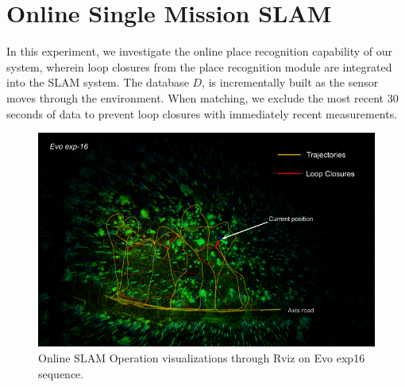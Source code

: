 \section{Online Single Mission SLAM}
\label{sec:exp_online_slam}
In this experiment, we investigate the online place recognition capability of our system, wherein loop closures from the place recognition module are integrated into the SLAM system. The database $D$, is incrementally built as the sensor moves through the environment. When matching, we exclude the most recent 30 seconds of data to prevent loop closures with immediately recent measurements.
\begin{figure}[htbp]
  \centering
  \includegraphics[width=0.9\columnwidth]{pics/exp_2_0_rviz.png}
  \caption{Online SLAM Operation visualizations through Rviz on Evo exp16 sequence. }
  \label{fig:exp_2_0_rviz}
\end{figure}



